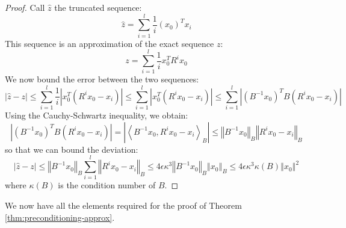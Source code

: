 \begin{proof}

Call $\hat{z}$ the truncated sequence: 
\[
\hat{z}=\sum_{i=1}^{l}\frac{1}{i}\left(x_{0}\right)^{T}x_{i}
\]
This sequence is an approximation of the exact sequence $z$: 
\[
z=\sum_{i=1}^{l}\frac{1}{i}x_{0}^{T}R^{i}x_{0}
\]
We now bound the error between the two sequences: 
\[
\left|\hat{z}-z\right|\leq\sum_{i=1}^{l}\frac{1}{i}\left|x_{0}^{T}\left(R^{i}x_{0}-x_{i}\right)\right|\leq\sum_{i=1}^{l}\left|x_{0}^{T}\left(R^{i}x_{0}-x_{i}\right)\right|\leq\sum_{i=1}^{l}\left|\left(B^{-1}x_{0}\right)^{T}B\left(R^{i}x_{0}-x_{i}\right)\right|
\]
Using the Cauchy-Schwartz inequality, we obtain: 
\[
\left|\left(B^{-1}x_{0}\right)^{T}B\left(R^{i}x_{0}-x_{i}\right)\right|=\left|\left\langle B^{-1}x_{0},R^{i}x_{0}-x_{i}\right\rangle _{B}\right|\leq\left\Vert B^{-1}x_{0}\right\Vert _{B}\left\Vert R^{i}x_{0}-x_{i}\right\Vert _{B}
\]
so that we can bound the deviation: 
\[
\left|\hat{z}-z\right|\leq\left\Vert B^{-1}x_{0}\right\Vert _{B}\sum_{i=1}^{l}\left\Vert R^{i}x_{0}-x_{i}\right\Vert _{B}\leq4\epsilon\kappa^{3}\left\Vert B^{-1}x_{0}\right\Vert _{B}\left\Vert x_{0}\right\Vert _{B}\leq4\epsilon\kappa^{3}\kappa\left(B\right)\left\Vert x_{0}\right\Vert ^{2}
\]
where $\kappa\left(B\right)$ is the condition number of $B$. \end{proof}

We now have all the elements required for the proof of Theorem \ref{thm:preconditioning-approx}.

